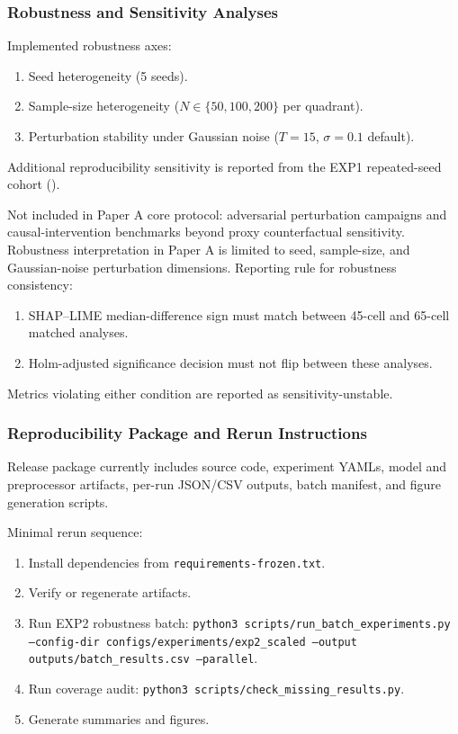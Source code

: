 \documentclass[twoside,11pt]{article}
\begin{document}
\subsubsection{Robustness and Sensitivity Analyses}
Implemented robustness axes:
\begin{enumerate}[leftmargin=*]
    \item Seed heterogeneity (5 seeds).
    \item Sample-size heterogeneity ($N\in\{50,100,200\}$ per quadrant).
    \item Perturbation stability under Gaussian noise ($T=15$, $\sigma=0.1$ default).
\end{enumerate}
Additional reproducibility sensitivity is reported from the EXP1 repeated-seed
cohort ().

Not included in Paper A core protocol: adversarial perturbation campaigns and
causal-intervention benchmarks beyond proxy counterfactual sensitivity.
Robustness interpretation in Paper A is limited to seed, sample-size, and
Gaussian-noise perturbation dimensions.
Reporting rule for robustness consistency:
\begin{enumerate}[leftmargin=*]
    \item SHAP--LIME median-difference sign must match between 45-cell and 65-cell matched analyses.
    \item Holm-adjusted significance decision must not flip between these analyses.
\end{enumerate}
Metrics violating either condition are reported as sensitivity-unstable.

\subsubsection{Reproducibility Package and Rerun Instructions}
Release package currently includes source code, experiment YAMLs, model and
preprocessor artifacts, per-run JSON/CSV outputs, batch manifest, and figure
generation scripts.

Minimal rerun sequence:
\begin{enumerate}[leftmargin=*]
    \item Install dependencies from \texttt{requirements-frozen.txt}.
    \item Verify or regenerate  artifacts.
    \item Run EXP2 robustness batch:
    \texttt{python3 scripts/run\_batch\_experiments.py --config-dir configs/experiments/exp2\_scaled --output outputs/batch\_results.csv --parallel}.
    \item Run coverage audit: \texttt{python3 scripts/check\_missing\_results.py}.
    \item Generate summaries and figures.
\end{enumerate}
\end{document}
